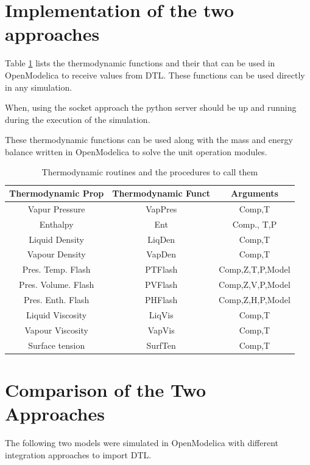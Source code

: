 \documentclass[12pt]{report}
\begin{document}
\section{Implementation of the two approaches}
Table \ref{Prop} lists the thermodynamic functions and their that can be used in OpenModelica to receive values from DTL. These functions can be used directly in any simulation. 

When, using the socket approach the python server should be up and running during the execution of the simulation. 

These thermodynamic functions can be used along with the mass and energy balance written in OpenModelica to solve the unit operation modules. 

\begin{table}
\label{Prop}
\caption{Thermodynamic routines and the procedures to call them}
\centering
\begin{tabular}{|c|c|c|} \hline
Thermodynamic Prop & Thermodynamic Funct & Arguments \\ \hline
Vapur Pressure & VapPres & Comp,T \\
Enthalpy & Ent & Comp., T,P \\
Liquid Density & LiqDen & Comp,T \\
Vapour Density & VapDen & Comp,T \\
Pres. Temp. Flash & PTFlash & Comp,Z,T,P,Model \\
Pres. Volume. Flash & PVFlash & Comp,Z,V,P,Model \\
Pres. Enth. Flash & PHFlash & Comp,Z,H,P,Model \\
Liquid Viscosity & LiqVis & Comp,T \\
Vapour Viscosity & VapVis & Comp,T \\
Surface tension & SurfTen & Comp,T \\ \hline
\end{tabular}
\end{table}

\section{Comparison of the Two Approaches}
The following two models were simulated in OpenModelica with different integration approaches to import DTL.
\end{document}
